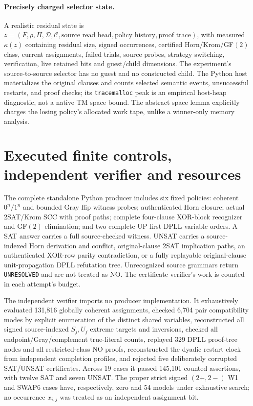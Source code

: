 \documentclass[11pt]{article}
\begin{document}
\paragraph{Precisely charged selector state.} A realistic residual state is $z=(F,\rho,\Pi,\mathcal{D},\mathcal{C},\text{source read head},\text{policy history},\text{proof trace})$, with measured $\kappa(z)$ containing residual size, signed occurrences, certified Horn/Krom/GF$(2)$ class, current assignments, failed trials, source probes, strategy switching, verification, live retained bits and guest/child dimensions. The experiment's source-to-source selector has no guest and no constructed child. The Python host materializes the original clauses and counts selected semantic events, unsuccessful restarts, and proof checks; its \texttt{tracemalloc} peak is an empirical host-heap diagnostic, not a native TM space bound. The abstract space lemma explicitly charges the losing policy's allocated work tape, unlike a winner-only memory analysis.

\section{Executed finite controls, independent verifier and resources}
The complete standalone Python producer includes six fixed policies: coherent $0^n/1^n$ and bounded Gray flip witness probes; authenticated Horn closure; actual 2SAT/Krom SCC with proof paths; complete four-clause XOR-block recognizer and GF$(2)$ elimination; and two complete UP-first DPLL variable orders. A SAT answer carries a full source-checked witness. UNSAT carries a source-indexed Horn derivation and conflict, original-clause 2SAT implication paths, an authenticated XOR-row parity contradiction, or a fully replayable original-clause unit-propagation DPLL refutation tree. Unrecognized source grammars return \texttt{UNRESOLVED} and are not treated as NO. The certificate verifier's work is counted in each attempt's budget.

The independent verifier imports no producer implementation. It exhaustively evaluated 131,816 globally coherent assignments, checked 6,704 pair compatibility modes by explicit enumeration of the distinct shared variables, reconstructed all signed source-indexed $S_j,U_j$ extreme targets and inversions, checked all endpoint/Gray/complement true-literal counts, replayed 329 DPLL proof-tree nodes and all restricted-class NO proofs, reconstructed the dyadic restart clock from independent completion profiles, and rejected five deliberately corrupted SAT/UNSAT certificates. Across 19 cases it passed 145,101 counted assertions, with twelve SAT and seven UNSAT. The proper strict signed $(2+,2-)$ W1 and SWAP6 cases have, respectively, zero and 54 models under exhaustive search; no occurrence $x_{i,j}$ was treated as an independent assignment bit.
\end{document}
